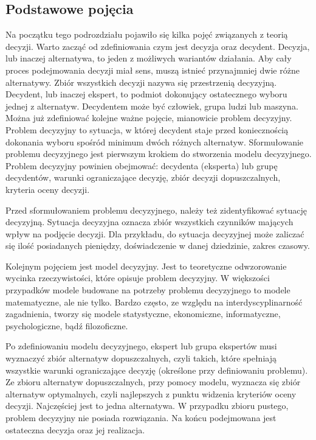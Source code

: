 \subsection{Podstawowe pojęcia}
Na początku tego podrozdziału pojawiło się kilka pojęć związanych z teorią 
decyzji. Warto zacząć od zdefiniowania czym jest decyzja oraz decydent. Decyzja,
lub inaczej alternatywa, to jeden z możliwych wariantów działania. Aby cały 
proces podejmowania decyzji miał sens, muszą istnieć przynajmniej dwie różne 
alternatywy. Zbiór wszystkich decyzji nazywa się przestrzenią decyzyjną. 
Decydent, lub inaczej ekspert, to podmiot dokonujący ostatecznego wyboru jednej 
z alternatyw. Decydentem może być człowiek, grupa ludzi lub maszyna. Można już 
zdefiniować kolejne ważne pojęcie, mianowicie problem decyzyjny. Problem 
decyzyjny to sytuacja, w której decydent staje przed koniecznością dokonania 
wyboru spośród minimum dwóch różnych alternatyw. Sformułowanie problemu 
decyzyjnego jest pierwszym krokiem do stworzenia modelu decyzyjnego. Problem 
decyzyjny powinien obejmować: decydenta (eksperta) lub grupę decydentów, 
warunki ograniczające decyzję, zbiór decyzji dopuszczalnych, kryteria oceny 
decyzji.

Przed sformułowaniem problemu decyzyjnego, należy też zidentyfikować sytuację 
decyzyjną. Sytuacja decyzyjna oznacza zbiór wszystkich czynników mających wpływ 
na podjęcie decyzji. Dla przykładu, do sytuacja decyzyjnej może zaliczać się 
ilość posiadanych pieniędzy, doświadczenie w danej dziedzinie, zakres czasowy.

Kolejnym pojęciem jest model decyzyjny. Jest to teoretyczne odwzorowanie 
wycinka rzeczywistości, które opisuje problem decyzyjny. W większości 
przypadków modele budowane na potrzeby problemu decyzyjnego to modele 
matematyczne, ale nie tylko. Bardzo często, ze względu na interdyscyplinarność 
zagadnienia, tworzy się modele statystyczne, ekonomiczne, informatyczne, 
psychologiczne, bądź filozoficzne.

Po zdefiniowaniu modelu decyzyjnego, ekspert lub grupa ekspertów musi wyznaczyć 
zbiór alternatyw dopuszczalnych, czyli takich, które spełniają wszystkie warunki
ograniczające decyzję (określone przy definiowaniu problemu). Ze zbioru 
alternatyw dopuszczalnych, przy pomocy modelu, wyznacza się zbiór alternatyw 
optymalnych, czyli najlepszych z punktu widzenia kryteriów oceny decyzji.
Najczęściej jest to jedna alternatywa. W przypadku zbioru pustego, problem 
decyzyjny nie posiada rozwiązania. Na końcu podejmowana jest ostateczna decyzja 
oraz jej realizacja.

